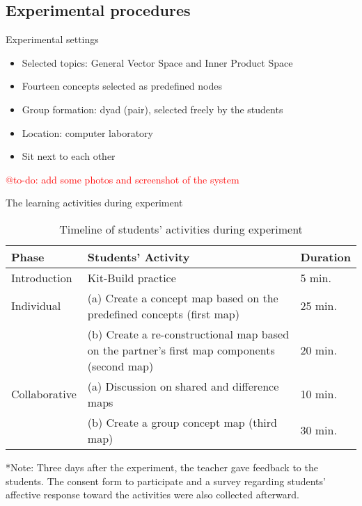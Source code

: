 \subsection{Experimental procedures}

\begin{frame}{Experimental settings}
\begin{itemize}
    \item Selected topics: General Vector Space and Inner Product Space
    \item Fourteen concepts selected as predefined nodes
    \item Group formation: dyad (pair), selected freely by the students
    \item Location: computer laboratory
    \item Sit next to each other
\end{itemize}
\textcolor{red}{@to-do: add some photos and screenshot of the system}

\end{frame}

\begin{frame}{The learning activities during experiment}
\begin{table}[tb]
\begin{center}
\begin{tabular}{p{2.5cm}|p{5.5cm}|p{2cm}}%
\hline
Phase & Students' Activity & Duration\\
\hline
Introduction & Kit-Build practice & 5 min.\\
Individual & (a) Create a concept map based on the predefined concepts (first map) & 25 min.\\
& (b) Create a re-constructional map based on the partner's first map components (second map) & 20 min.\\
Collaborative & (a) Discussion on shared and difference maps & 10 min.\\
& (b) Create a group concept map  (third map) & 30 min.\\
\hline
\end{tabular}
\end{center}
\caption{\label{tab:exp_setting} Timeline of students' activities during experiment}
\end{table}
 
{\tiny **Note: Three days after the experiment, the teacher gave feedback to the students.
The consent form to participate and a survey regarding students' affective response
toward the activities were also collected afterward. }

\end{frame}

